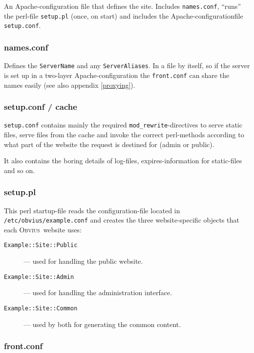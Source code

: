 \documentclass[a4paper,12pt]{article}
\newcommand{\obvius}{\textsc{Obvius}}
\newcommand{\modrewrite}{\texttt{mod\_rewrite}}
\begin{document}
An Apache-configuration file that defines the site. Includes
\texttt{names.conf}, ``runs'' the perl-file \texttt{setup.pl}
(once, on start) and includes the Apache-configurationfile
\texttt{setup.conf}.

\subsubsection{names.conf}

Defines the \texttt{ServerName} and any \texttt{ServerAliases}. In a
file by itself, so if the server is set up in a two-layer
Apache-configuration the \texttt{front.conf} can share the names
easily (see also appendix \ref{proxying}).

\subsubsection{setup.conf / cache}

\texttt{setup.conf} contains mainly the required
\modrewrite-directives to serve static files, serve files from the
cache and invoke the correct perl-methods according to what part of
the website the request is destined for (admin or public).

It also contains the boring details of log-files, expires-information
for static-files and so on.

\subsubsection{setup.pl}

This perl startup-file reads the configuration-file located in
\texttt{/etc/obvius/example.conf} and creates the three
website-specific objects that each \obvius\ website uses:

\begin{description}
\item[\texttt{Example::Site::Public}] --- used for handling the public website.
\item[\texttt{Example::Site::Admin}]  --- used for handling the administration interface.
\item[\texttt{Example::Site::Common}] --- used by both for generating the common
  content.
\end{description}

\subsubsection{front.conf}
\end{document}

